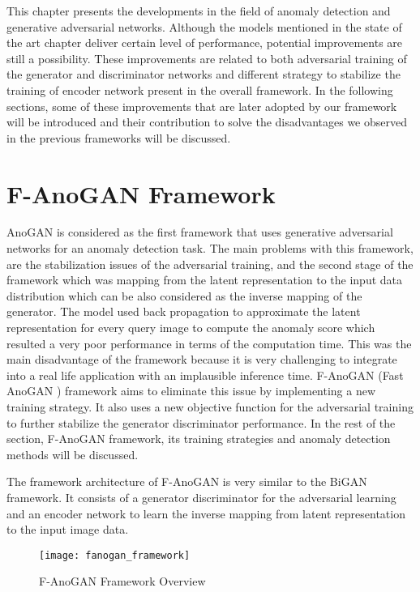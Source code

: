 
\begingroup

This chapter presents the developments in the field of anomaly detection and generative adversarial
networks. Although the models mentioned in the state of the art chapter deliver certain level of
performance, potential improvements are still a possibility. These improvements are related to both
adversarial training of the generator and discriminator networks and different strategy to stabilize
the training of encoder network present in the overall framework. In the following sections, some of
these improvements that are later adopted by our framework will be introduced and their contribution
to solve the disadvantages we observed in the previous frameworks will be discussed. 

\section{F-AnoGAN Framework}
\label{sec:fanogan}

AnoGAN \cite{Schlegl2017UnsupervisedAD} is considered as the first framework that uses generative
adversarial networks for an anomaly detection task. The main problems with this framework, are the
stabilization issues of the adversarial training, and the second stage of the framework which was
mapping from the latent representation to the input data distribution which can be also considered
as the inverse mapping of the generator. The model used back propagation to approximate the latent
representation for every query image to compute the anomaly score which resulted a very poor
performance in terms of the computation time. This was the main disadvantage of the framework
because it is very challenging to integrate into a real life application with an implausible
inference time. F-AnoGAN (Fast AnoGAN ) framework \cite{pub.1111824956} aims to eliminate this issue
by implementing a new training strategy. It also uses a new objective function for the adversarial
training to further stabilize the generator discriminator performance. In the rest of the section,
F-AnoGAN framework, its training strategies and anomaly detection methods will be discussed.

The framework architecture of F-AnoGAN is very similar to the BiGAN \cite{Donahue2017AdversarialFL}
framework. It consists of a generator discriminator for the adversarial learning and an encoder
network to learn the inverse mapping from latent representation to the input image data.
\begin{figure}[h!]
	\centering
	\texttt{[image: fanogan\_framework]}
	\caption{F-AnoGAN Framework Overview \cite{pub.1111824956}}
	\label{fig:fanogan_network}
\end{figure}


